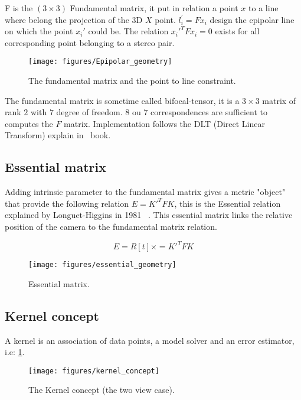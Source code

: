\documentclass[11pt, letterpaper]{report}
\begin{document}
\begin{itemize}
F is the $(3\times3)$ Fundamental matrix, it put in relation a point $x$ to a line where belong the projection of the 3D $X$ point. $l_i^\prime=Fx_i$ design the epipolar line on which the point $x_i'$ could be. The relation $x_i'^TFx_i=0$ exists for all corresponding point belonging to a stereo pair.

\begin{figure}[h!]
\begin{center}
\texttt{[image: figures/Epipolar\_geometry]}
\caption{The fundamental matrix and the point to line constraint.}
\end{center}
\end{figure}

The fundamental matrix is sometime called bifocal-tensor, it is a \textbf{$3 \times 3$} matrix of rank $2$ with $7$ degree of freedom. $8$ ou $7$ correspondences are sufficient to computes the $F$ matrix. Implementation follows the DLT (Direct Linear Transform) explain in~\cite{Hartley2004} book.

\newpage
\subsection{Essential matrix}

Adding intrinsic parameter to the fundamental matrix gives a metric "object" that provide the following relation $E = K'^T F K$, this is the Essential relation explained by Longuet-Higgins in 1981~ \cite{LonguetHiggins81}. This essential matrix links the relative position of the camera to the fundamental matrix relation.

\begin{equation}
E = R [t]\times = K'^T F K
\end{equation}

\begin{figure}[h!]
\begin{center}
\texttt{[image: figures/essential\_geometry]}
\caption{Essential matrix.}
\end{center}
\end{figure}

\newpage
\subsection{Kernel concept}
A kernel is an association of data points, a model solver and an error estimator, i.e: \ref{kernel_concept_fig}.
\end{itemize}

\begin{figure}[h!]
\begin{center}
\texttt{[image: figures/kernel\_concept]}
\caption{The Kernel concept (the two view case).}
\label{kernel_concept_fig}
\end{center}
\end{figure}
\end{document}
